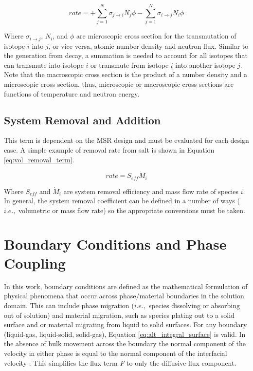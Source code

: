 \begin{equation}
	rate = + \sum_{j=1}^{N} \sigma_{j\rightarrow i}N_{j}\phi - \sum_{j=1}^{N} \sigma_{i\rightarrow j}N_{i}\phi
	\label{eq:vol_trans_term}
\end{equation}

Where $\sigma_{i\rightarrow j}$, $N_{i}$, and $\phi$ are microscopic cross section for the transmutation of isotope $i$ into $j$, or vice versa, atomic number density and neutron flux.  Similar to the generation from decay, a summation is needed to account for all isotopes that can transmute into isotope $i$ or transmute from isotope $i$ into another isotope $j$. Note that the macroscopic cross section is the product of a number density and a microscopic cross section, thus, microscopic or macroscopic cross sections are functions of temperature and neutron energy.

\subsection{System Removal and Addition}
This term is dependent on the MSR design and must be evaluated for each design case. A simple example of removal rate from salt is shown in Equation \ref{eq:vol_removal_term}.

\begin{equation}
	rate = S_{eff}\dot{M}_{i}
	\label{eq:vol_removal_term}
\end{equation}

Where $S_{eff}$ and $\dot{M}_{i}$ are system removal efficiency and mass flow rate of species $i$. In general, the system removal coefficient can be defined in a number of ways ($i.e.,$ volumetric or mass flow rate) so the appropriate conversions must be taken.  

\section{Boundary Conditions and Phase Coupling}
In this work, boundary conditions are defined as the mathematical formulation of physical phenomena that occur across phase/material boundaries in the solution domain. This can include phase migration ($i.e.,$ species dissolving or absorbing out of solution) and material migration, such as species plating out to a solid surface and or material migrating from liquid to solid surfaces.  For any boundary (liquid-gas, liquid-solid, solid-gas), Equation \ref{eq:alt_integral_surface} is valid. In the absence of bulk movement across the boundary the normal component of the velocity in either phase is equal to the normal component of the interfacial velocity \cite{deen2016}. This simplifies the flux term \textit{F} to only the diffusive flux component. 



